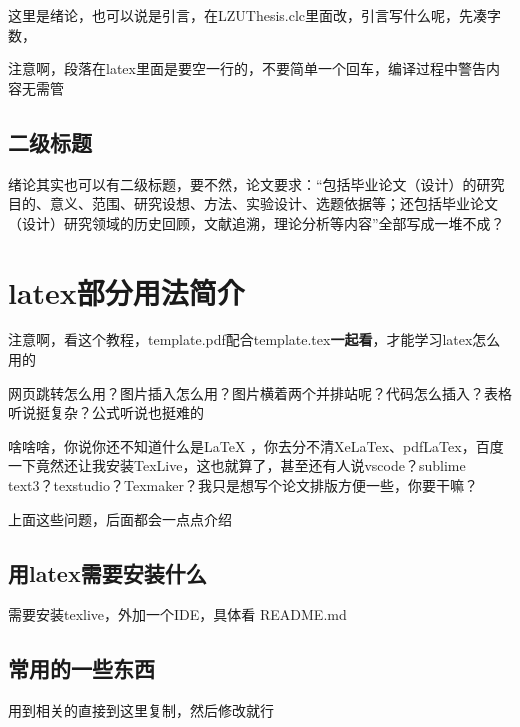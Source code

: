 \documentclass[AutoFakeBold]{LZUThesis}
\begin{document}

这里是绪论，也可以说是引言，在LZUThesis.clc里面改，引言写什么呢，先凑字数，

注意啊，段落在latex里面是要空一行的，不要简单一个回车，编译过程中警告内容无需管

\section{二级标题}

绪论其实也可以有二级标题，要不然，论文要求：“包括毕业论文（设计）的研究目的、意义、范围、研究设想、方法、实验设计、选题依据等；还包括毕业论文（设计）研究领域的历史回顾，文献追溯，理论分析等内容”全部写成一堆不成？



\chapter{latex部分用法简介}

注意啊，看这个教程，template.pdf配合template.tex\textbf{一起看}，才能学习latex怎么用的

网页跳转怎么用？图片插入怎么用？图片横着两个并排站呢？代码怎么插入？表格听说挺复杂？公式听说也挺难的

啥啥啥，你说你还不知道什么是LaTeX ，你去分不清XeLaTex、pdfLaTex，百度一下竟然还让我安装TexLive，这也就算了，甚至还有人说vscode？sublime text3？texstudio？Texmaker？我只是想写个论文排版方便一些，你要干嘛？

上面这些问题，后面都会一点点介绍

\section{用latex需要安装什么}

需要安装texlive，外加一个IDE，具体看 README.md


\section{常用的一些东西} %
\label{sec:常用的一些东西}

用到相关的直接到这里复制，然后修改就行
\end{document}
